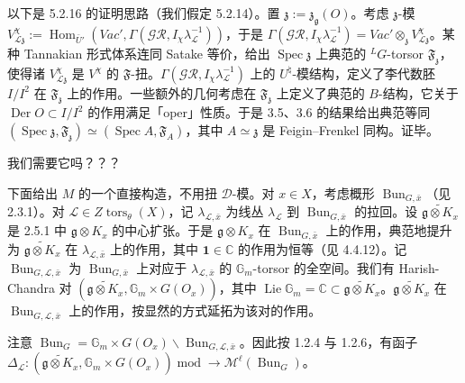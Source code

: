  以下是 5.2.16 的证明思路（我们假定 5.2.14）。置 $\mathfrak{z}:=\mathfrak{z}_{\mathfrak{g}}(O)$。考虑 $\mathfrak{z}$-模 $V^\chi_{\mathcal{L}\mathfrak{z}}:=\operatorname{Hom}_{\bar U'}(Vac',\allowbreak\Gamma(\mathcal{GR},I_\chi\lambda_{\mathcal{L}}^{-1}))$，于是 $\Gamma(\mathcal{GR},I_\chi\lambda_{\mathcal{L}}^{-1})=Vac'\otimes_{\mathfrak{z}}V^\chi_{\mathcal{L}\mathfrak{z}}$。某种 Tannakian 形式体系连同 Satake 等价，给出 $\operatorname{Spec}\mathfrak{z}$ 上典范的 ${}^{L}G$-torsor $\mathfrak{F}_{\mathfrak{z}}$，使得诸 $V^\chi_{\mathcal{L}\mathfrak{z}}$ 是 $V^\chi$ 的 $\mathfrak{F}$-扭。$\Gamma(\mathcal{GR},I_\chi\lambda_{\mathcal{L}}^{-1})$ 上的 $U^\natural$-模结构，定义了李代数胚 $I/I^2$ 在 $\mathfrak{F}_{\mathfrak{z}}$ 上的作用。一些额外的几何考虑在 $\mathfrak{F}_{\mathfrak{z}}$ 上定义了典范的 $B$-结构，它关于 $\operatorname{Der}O\subset I/I^2$ 的作用满足「oper」性质。于是 3.5、3.6 的结果给出典范等同 $(\operatorname{Spec}\mathfrak{z},\mathfrak{F}_{\mathfrak{z}})\simeq(\operatorname{Spec}A,\mathfrak{F}_A)$，其中 $A\simeq\mathfrak{z}$ 是 Feigin--Frenkel 同构。证毕。

 我们需要它吗？？？

下面给出 $M$ 的一个直接构造，不用扭 $\mathcal{D}$-模。对 $x\in X$，考虑概形 $\operatorname{Bun}_{G,\bar x}$（见 2.3.1）。对 $\mathcal{L}\in Z\operatorname{tors}_\theta(X)$，记 $\lambda_{\mathcal{L},\bar x}$ 为线丛 $\lambda_{\mathcal{L}}$ 到 $\operatorname{Bun}_{G,\bar x}$ 的拉回。设 $\widetilde{\mathfrak{g}\otimes K_x}$ 是 2.5.1 中 $\mathfrak{g}\otimes K_x$ 的中心扩张。于是 $\mathfrak{g}\otimes K_x$ 在 $\operatorname{Bun}_{G,\bar x}$ 上的作用，典范地提升为 $\widetilde{\mathfrak{g}\otimes K_x}$ 在 $\lambda_{\mathcal{L},\bar x}$ 上的作用，其中 $\mathbf{1}\in\mathbb{C}$ 的作用为恒等（见 4.4.12）。记 $\operatorname{Bun}_{G,\mathcal{L},\bar x}$ 为 $\operatorname{Bun}_{G,\bar x}$ 上对应于 $\lambda_{\mathcal{L},\bar x}$ 的 $\mathbb{G}_m$-torsor 的全空间。我们有 Harish-Chandra 对 $(\widetilde{\mathfrak{g}\otimes K_x},\mathbb{G}_m\times G(O_x))$，其中 $\operatorname{Lie}\mathbb{G}_m=\mathbb{C}\subset\widetilde{\mathfrak{g}\otimes K_x}$。$\widetilde{\mathfrak{g}\otimes K_x}$ 在 $\operatorname{Bun}_{G,\mathcal{L},\bar x}$ 上的作用，按显然的方式延拓为该对的作用。

注意 $\operatorname{Bun}_G=\mathbb{G}_m\times G(O_x)\backslash\operatorname{Bun}_{G,\mathcal{L},\bar x}$。因此按 1.2.4 与 1.2.6，有函子 $\Delta_{\mathcal{L}}:\allowbreak\left(\widetilde{\mathfrak{g}\otimes K_x},\mathbb{G}_m\times G(O_x)\right)\allowbreak\operatorname{mod}\to\mathcal{M}^\ell(\operatorname{Bun}_G)$。


